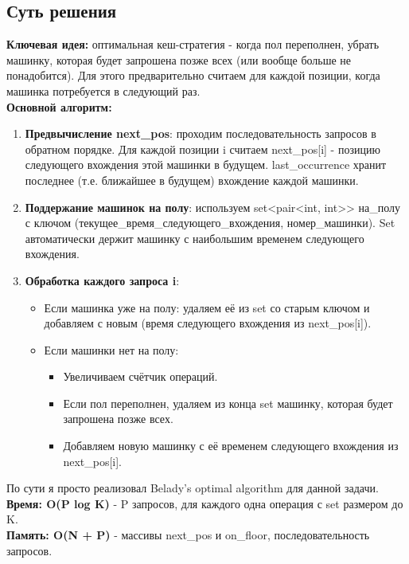 \documentclass[a4paper,12pt]{article}
\begin{document}
    \subsection*{Суть решения}
    \textbf{Ключевая идея:} оптимальная кеш-стратегия - когда пол переполнен, убрать машинку, которая будет запрошена позже всех (или вообще больше не понадобится). Для этого предварительно считаем для каждой позиции, когда машинка потребуется в следующий раз.\\
    \textbf{Основной алгоритм:}
    \begin{enumerate}
        \item \textbf{Предвычисление next\_pos}: проходим последовательность запросов в обратном порядке. Для каждой позиции i считаем next\_pos[i] - позицию следующего вхождения этой машинки в будущем. last\_occurrence хранит последнее (т.е. ближайшее в будущем) вхождение каждой машинки.
        \item \textbf{Поддержание машинок на полу}: используем set<pair<int, int>> на\_полу с ключом (текущее\_время\_следующего\_вхождения, номер\_машинки). Set автоматически держит машинку с наибольшим временем следующего вхождения.
        \item \textbf{Обработка каждого запроса i}:
        \begin{itemize}
            \item Если машинка уже на полу: удаляем её из set со старым ключом и добавляем с новым (время следующего вхождения из next\_pos[i]).
            \item Если машинки нет на полу:
            \begin{itemize}
                \item Увеличиваем счётчик операций.
                \item Если пол переполнен, удаляем из конца set машинку, которая будет запрошена позже всех.
                \item Добавляем новую машинку с её временем следующего вхождения из next\_pos[i].
            \end{itemize}
        \end{itemize}
    \end{enumerate}
    По сути я просто реализовал Belady's optimal algorithm для данной задачи.\\
    \textbf{Время: O(P log K)} - P запросов, для каждого одна операция с set размером до K.\\
    \textbf{Память: O(N + P)} - массивы next\_pos и on\_floor, последовательность запросов.
\end{document}
